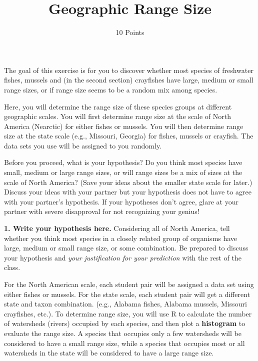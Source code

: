 \documentclass[11pt]{article}
\title{Geographic Range Size}
\author{10 Points}
\date{}                                           %
\begin{document}
\maketitle
\thispagestyle{plain}

The goal of this exercise is for you to discover whether most species of
freshwater fishes, mussels and (in the second section) crayfishes have
large, medium or small range sizes, or if range size seems to be a
random mix among species.

Here, you will determine the range size of these species groups at
different geographic scales. You will first determine range size at the
scale of North America (Nearctic) for either fishes or mussels. You will
then determine range size at the state scale (e.g., Missouri, Georgia)
for fishes, mussels or crayfish. The data sets you use will be assigned
to you randomly.

Before you proceed, what is your hypothesis? Do you think most species
have small, medium or large range sizes, or will range sizes be a mix of
sizes at the scale of North America? (Save your ideas about the smaller
state scale for later.) Discuss your ideas with your partner but your
hypothesis does not have to agree with your partner's hypothesis. If
your hypotheses don't agree, glare at your partner with severe
disapproval for not recognizing your genius!

\textbf{1. Write your hypothesis here.} Considering all of North America, tell
whether you think most species in a closely related group of organisms
have large, medium or small range size, or some combination. Be prepared
to discuss your hypothesis and \emph{your justification for your
prediction} with the rest of the class.

\vspace{7\baselineskip}

For the North American scale, each student pair will be assigned a data
set using either fishes or mussels. For the state scale, each student
pair will get a different state and taxon combination. (e.g., Alabama
fishes, Alabama mussels, Missouri crayfishes, etc.). To determine range
size, you will use R to calculate the number of watersheds (rivers)
occupied by each species, and then plot a \textbf{histogram} to evaluate
the range size. A species that occupies only a few watersheds will be
considered to have a small range size, while a species that occupies
most or all watersheds in the state will be considered to have a large
range size.

\vspace{2ex}
\end{document}
